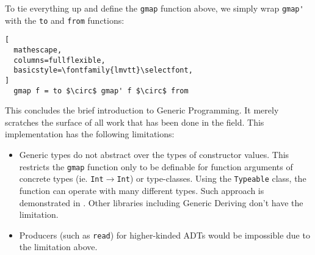 \documentclass[8pt]{extarticle}
\begin{document}
To tie everything up and define the \verb+gmap+ function above, we simply wrap \verb+gmap'+ with the \verb+to+ and \verb+from+ functions:
\begin{lstlisting}[
  mathescape,
  columns=fullflexible,
  basicstyle=\fontfamily{lmvtt}\selectfont,
]
  gmap f = to $\circ$ gmap' f $\circ$ from
\end{lstlisting}
This concludes the brief introduction to Generic Programming. It merely scratches the surface of all work that has been done in the field. This implementation has the following limitations:
\begin{itemize}
\item Generic types do not abstract over the types of constructor values. This restricts the \verb+gmap+ function only to be definable for function arguments of concrete types (ie. \verb+Int+$\to$\verb+Int+) or type-classes. Using the \verb+Typeable+ class, the function can operate with many different types. Such approach is demonstrated in \cite{RegularDemo}. Other libraries including Generic Deriving don't have the limitation.
\item Producers (such as \verb+read+) for higher-kinded ADTs would be impossible due to the limitation above.
\end{itemize}
\end{document}
